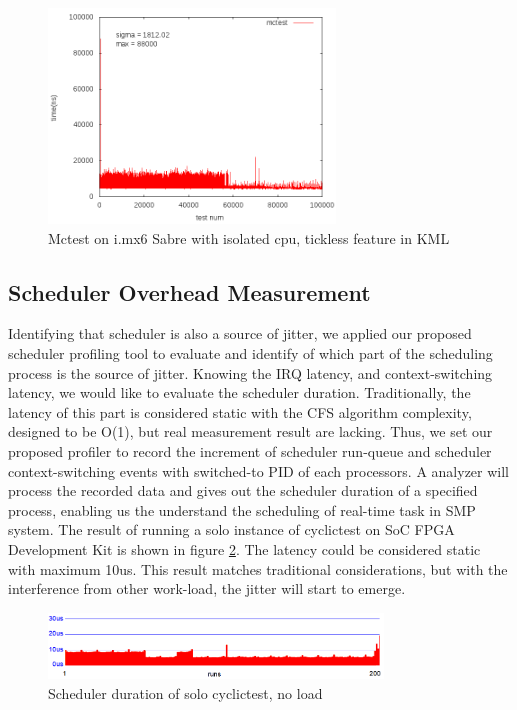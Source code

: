 \documentclass[conference]{IEEEtran}
\begin{document}
    \begin{figure} \centering \includegraphics[width=3in]{img/mctest-kml.png} \caption{Mctest on i.mx6 Sabre with
    isolated cpu, tickless feature in KML} \label{fig:imx6_mctest_kml} \end{figure}
    
\subsection{Scheduler Overhead Measurement}
    
    Identifying that scheduler is also a source of jitter, we applied our proposed scheduler profiling tool to evaluate
    and identify of which part of the scheduling process is the source of jitter. Knowing the IRQ latency, and
    context-switching latency, we would like to evaluate the scheduler duration. Traditionally, the latency of this part
    is considered static with the CFS algorithm complexity, designed to be O(1), but real measurement result are
    lacking. Thus, we set our proposed profiler to record the increment of scheduler run-queue and scheduler
    context-switching events with switched-to PID of each processors. A analyzer will process the recorded data and
    gives out the scheduler duration of a specified process, enabling us the understand the scheduling of real-time task
    in SMP system. The result of running a solo instance of cyclictest on SoC FPGA Development Kit is shown in figure
    \ref{fig:sd_solo}. The latency could be considered static with maximum 10us. This result matches traditional
    considerations, but with the interference from other work-load, the jitter will start to emerge.

    \begin{figure} \centering \includegraphics[width=3.5in]{img/sd-solo.png} \caption{Scheduler duration of solo
    cyclictest, no load} \label{fig:sd_solo} \end{figure}
\end{document}
